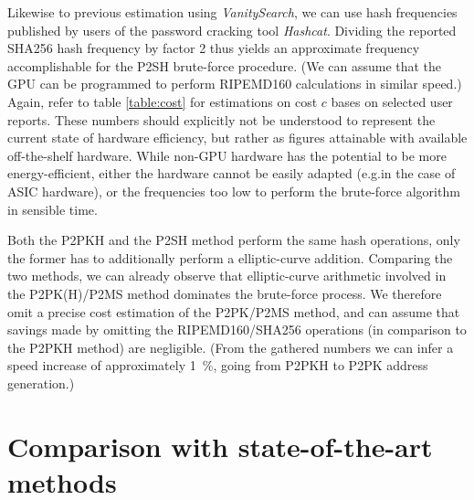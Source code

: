 \documentclass[a4paper,11pt,titlepage]{scrbook}
\begin{document}
Likewise to previous estimation using \emph{VanitySearch}, we can use hash frequencies published by users of the password cracking tool \emph{Hashcat}.
Dividing the reported SHA256 hash frequency by factor 2 thus yields an approximate frequency accomplishable for the P2SH brute-force procedure.
(We can assume that the GPU can be programmed to perform RIPEMD160 calculations in similar speed.)
Again, refer to table \ref{table:cost} for estimations on cost $c$ bases on selected user reports.
These numbers should explicitly not be understood to represent the current state of hardware efficiency, but rather as figures attainable with available off-the-shelf hardware.
While non-GPU hardware has the potential to be more energy-efficient, either the hardware cannot be easily adapted (e.g.\@ in the case of ASIC hardware), or the frequencies too low to perform the brute-force algorithm in sensible time.

Both the P2PKH and the P2SH method perform the same hash operations, only the former has to additionally perform a elliptic-curve addition.
Comparing the two methods, we can already observe that elliptic-curve arithmetic involved in the P2PK(H)/P2MS method dominates the brute-force process.
We therefore omit a precise cost estimation of the P2PK/P2MS method, and can assume that savings made by omitting the RIPEMD160/SHA256 operations (in comparison to the P2PKH method) are negligible.
(From the gathered numbers we can infer a speed increase of approximately \SI{1}{\percent}, going from P2PKH to P2PK address generation.)

\section{Comparison with state-of-the-art methods}\label{sec:comparison}
\end{document}
